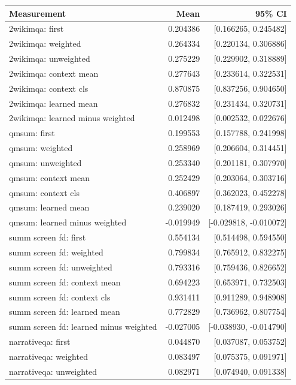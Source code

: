 \begin{table}[H]
\centering\small
\begin{tabularx}{\linewidth}{Yrr}
\toprule
Measurement & Mean & 95\% CI \\
\midrule
2wikimqa: first & 0.204386 & [0.166265, 0.245482] \\
2wikimqa: weighted & 0.264334 & [0.220134, 0.306886] \\
2wikimqa: unweighted & 0.275229 & [0.229902, 0.318889] \\
2wikimqa: context mean & 0.277643 & [0.233614, 0.322531] \\
2wikimqa: context cls & 0.870875 & [0.837256, 0.904650] \\
2wikimqa: learned mean & 0.276832 & [0.231434, 0.320731] \\
2wikimqa: learned minus weighted & 0.012498 & [0.002532, 0.022676] \\
qmsum: first & 0.199553 & [0.157788, 0.241998] \\
qmsum: weighted & 0.258969 & [0.206604, 0.314451] \\
qmsum: unweighted & 0.253340 & [0.201181, 0.307970] \\
qmsum: context mean & 0.252429 & [0.203064, 0.303716] \\
qmsum: context cls & 0.406897 & [0.362023, 0.452278] \\
qmsum: learned mean & 0.239020 & [0.187419, 0.293026] \\
qmsum: learned minus weighted & -0.019949 & [-0.029818, -0.010072] \\
summ screen fd: first & 0.554134 & [0.514498, 0.594550] \\
summ screen fd: weighted & 0.799834 & [0.765912, 0.832275] \\
summ screen fd: unweighted & 0.793316 & [0.759436, 0.826652] \\
summ screen fd: context mean & 0.694223 & [0.653971, 0.732503] \\
summ screen fd: context cls & 0.931411 & [0.911289, 0.948908] \\
summ screen fd: learned mean & 0.772829 & [0.736962, 0.807754] \\
summ screen fd: learned minus weighted & -0.027005 & [-0.038930, -0.014790] \\
narrativeqa: first & 0.044870 & [0.037087, 0.053752] \\
narrativeqa: weighted & 0.083497 & [0.075375, 0.091971] \\
narrativeqa: unweighted & 0.082971 & [0.074940, 0.091338] \\

\end{tabularx}
\end{table}
